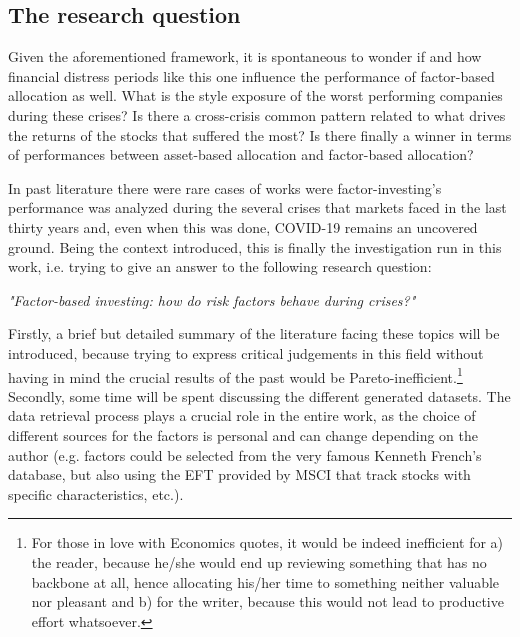 \documentclass[12pt]{article}
\begin{document}
\newpage
\subsection{The research question}
Given the aforementioned framework, it is spontaneous to wonder if and how financial distress periods like this one influence the performance of factor-based allocation as well. What is the style exposure of the worst performing companies during these crises? Is there a cross-crisis common pattern related to what drives the returns of the stocks that suffered the most? Is there finally a winner in terms of performances between asset-based allocation and factor-based allocation?

In past literature there were rare cases of works were factor-investing's performance was analyzed during the several crises that markets faced in the last thirty years and, even when this was done, COVID-19 remains an uncovered ground. Being the context introduced, this is finally the investigation run in this work, i.e. trying to give an answer to the following research question:

\begin{center}\textit{"Factor-based investing: how do risk factors behave during crises?"}\end{center}

Firstly, a brief but detailed summary of the literature facing these topics will be introduced, because trying to express critical judgements in this field without having in mind the crucial results of the past would be Pareto-inefficient.\footnote{For those in love with Economics quotes, it would be indeed inefficient for a) the reader, because he/she would end up reviewing something that has no backbone at all, hence allocating his/her time to something neither valuable nor pleasant and b) for the writer, because this would not lead to productive effort whatsoever.} Secondly, some time will be spent discussing the different generated datasets. The data retrieval process plays a crucial role in the entire work, as the choice of different sources for the factors is personal and can change depending on the author (e.g.  factors could be selected from the very famous Kenneth French's database, but also using the EFT provided by MSCI that track stocks with specific characteristics, etc.).
\end{document}
